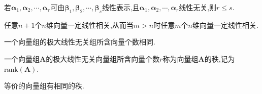 \documentclass[9pt,a4paper]{book}
\begin{document}
\begin{inference}
	若$ \bm{\alpha}_1,\bm{\alpha}_2,\cdots,\bm{\alpha}_r $可由$ \bm{\beta}_1,\bm{\beta}_2,\cdots,\bm{\beta}_s $线性表示,且$ \bm{\alpha}_1,\bm{\alpha}_2,\cdots,\bm{\alpha}_r $线性无关,则$ r\leqslant s $.
\end{inference}
\begin{inference}
	任意$  n+1  $个$  n  $维向量一定线性相关,从而当$ m>n $时任意$ m $个$ n $维向量一定线性相关.
\end{inference}
\begin{inference}
	一个向量组的极大线性无关组所含向量个数相同.
\end{inference}
\begin{defination}[向量组的秩]
一个向量组$ \bm{A} $的极大线性无关向量组所含向量个数$ r $称为向量组$ \bm{A} $的秩,记为$ \mathrm{rank}(\bm{A}) $.
\end{defination}
\begin{inference}
	等价的向量组有相同的秩.
\end{inference}
\end{document}
